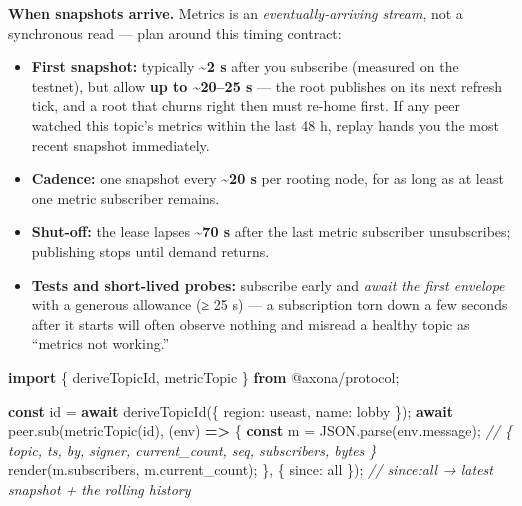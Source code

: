 \documentclass[
  nobib]{tufte-handout}
\newenvironment{Shaded}{}{}
\newcommand{\AttributeTok}[1]{\textcolor[rgb]{0.49,0.56,0.16}{#1}}
\newcommand{\BuiltInTok}[1]{\textcolor[rgb]{0.00,0.50,0.00}{#1}}
\newcommand{\CommentTok}[1]{\textcolor[rgb]{0.38,0.63,0.69}{\textit{#1}}}
\newcommand{\ControlFlowTok}[1]{\textcolor[rgb]{0.00,0.44,0.13}{\textbf{#1}}}
\newcommand{\DataTypeTok}[1]{\textcolor[rgb]{0.56,0.13,0.00}{#1}}
\newcommand{\FunctionTok}[1]{\textcolor[rgb]{0.02,0.16,0.49}{#1}}
\newcommand{\ImportTok}[1]{\textcolor[rgb]{0.00,0.50,0.00}{\textbf{#1}}}
\newcommand{\KeywordTok}[1]{\textcolor[rgb]{0.00,0.44,0.13}{\textbf{#1}}}
\newcommand{\NormalTok}[1]{#1}
\newcommand{\OperatorTok}[1]{\textcolor[rgb]{0.40,0.40,0.40}{#1}}
\newcommand{\StringTok}[1]{\textcolor[rgb]{0.25,0.44,0.63}{#1}}
\providecommand{\tightlist}{%
  \setlength{\itemsep}{0pt}\setlength{\parskip}{0pt}}
\begin{document}
\textbf{When snapshots arrive.} Metrics is an \emph{eventually-arriving
stream}, not a synchronous read --- plan around this timing contract:

\begin{itemize}
\tightlist
\item
  \textbf{First snapshot:} typically \textbf{\textasciitilde2 s} after
  you subscribe (measured on the testnet), but allow \textbf{up to
  \textasciitilde20--25 s} --- the root publishes on its next refresh
  tick, and a root that churns right then must re-home first. If any
  peer watched this topic's metrics within the last 48 h, replay hands
  you the most recent snapshot immediately.
\item
  \textbf{Cadence:} one snapshot every \textbf{\textasciitilde20 s} per
  rooting node, for as long as at least one metric subscriber remains.
\item
  \textbf{Shut-off:} the lease lapses \textbf{\textasciitilde70 s} after
  the last metric subscriber unsubscribes; publishing stops until demand
  returns.
\item
  \textbf{Tests and short-lived probes:} subscribe early and \emph{await
  the first envelope} with a generous allowance (≥ 25 s) --- a
  subscription torn down a few seconds after it starts will often
  observe nothing and misread a healthy topic as ``metrics not
  working.''
\end{itemize}

\begin{Shaded}
\begin{Highlighting}[]
\ImportTok{import}\NormalTok{ \{ deriveTopicId}\OperatorTok{,}\NormalTok{ metricTopic \} }\ImportTok{from} \StringTok{\textquotesingle{}@axona/protocol\textquotesingle{}}\OperatorTok{;}

\KeywordTok{const}\NormalTok{ id }\OperatorTok{=} \ControlFlowTok{await} \FunctionTok{deriveTopicId}\NormalTok{(\{ }\DataTypeTok{region}\OperatorTok{:} \StringTok{\textquotesingle{}useast\textquotesingle{}}\OperatorTok{,} \DataTypeTok{name}\OperatorTok{:} \StringTok{\textquotesingle{}lobby\textquotesingle{}}\NormalTok{ \})}\OperatorTok{;}
\ControlFlowTok{await}\NormalTok{ peer}\OperatorTok{.}\FunctionTok{sub}\NormalTok{(}\FunctionTok{metricTopic}\NormalTok{(id)}\OperatorTok{,}\NormalTok{ (env) }\KeywordTok{=\textgreater{}}\NormalTok{ \{}
  \KeywordTok{const}\NormalTok{ m }\OperatorTok{=} \BuiltInTok{JSON}\OperatorTok{.}\FunctionTok{parse}\NormalTok{(env}\OperatorTok{.}\AttributeTok{message}\NormalTok{)}\OperatorTok{;}
  \CommentTok{// \{ topic, ts, by, signer, current\_count, seq, subscribers, bytes \}}
  \FunctionTok{render}\NormalTok{(m}\OperatorTok{.}\AttributeTok{subscribers}\OperatorTok{,}\NormalTok{ m}\OperatorTok{.}\AttributeTok{current\_count}\NormalTok{)}\OperatorTok{;}
\NormalTok{\}}\OperatorTok{,}\NormalTok{ \{ }\DataTypeTok{since}\OperatorTok{:} \StringTok{\textquotesingle{}all\textquotesingle{}}\NormalTok{ \})}\OperatorTok{;}   \CommentTok{// since:\textquotesingle{}all\textquotesingle{} → latest snapshot + the rolling history}
\end{Highlighting}
\end{Shaded}
\end{document}
